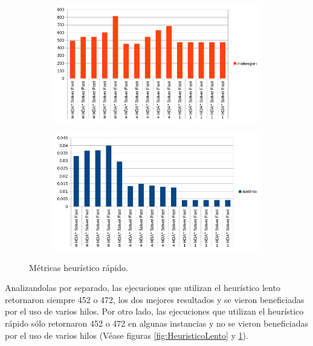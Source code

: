 \begin{figure}[h]
    \begin{subfigure}{.5\textwidth}
        \begin{center}
            \includegraphics[width=\textwidth]{Media/Ch2/Makespan_Fast_HDA.png}
        \end{center}
    \end{subfigure}
    \begin{subfigure}{.5\textwidth}
        \begin{center}
            \includegraphics[width=\textwidth]{Media/Ch2/Runtime_Fast_HDA.png}
        \end{center}
    \end{subfigure}
    \caption{Métricas heurístico rápido.}
    \label{fig:HeuristicoRapido}
\end{figure}

Analizandolas por separado, las ejecuciones que utilizan el heurístico lento
retornaron siempre 452 o 472, los dos mejores resultados y se vieron
beneficiadas por el uso de varios hilos.
Por otro lado, las ejecuciones que utilizan el heurístico rápido
sólo retornaron 452 o 472 en algunas instancias y no se vieron
beneficiadas por el uso de varios hilos
(Véase figuras \ref{fig:HeuristicoLento} y \ref{fig:HeuristicoRapido}).

